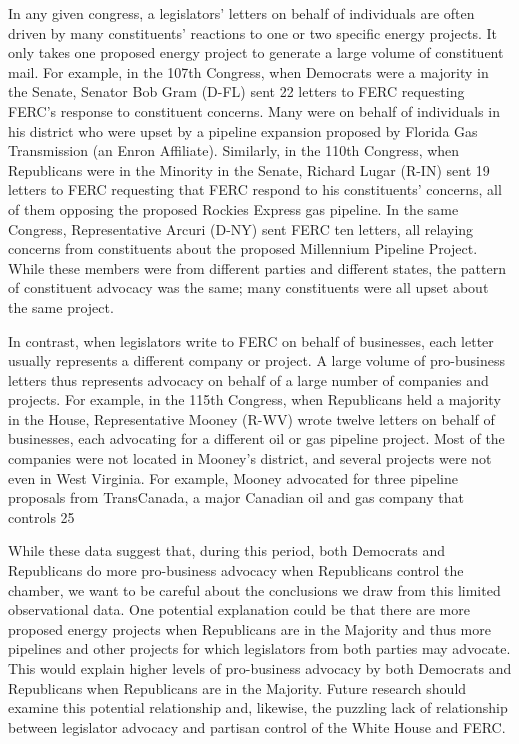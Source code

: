 \documentclass{article}
\begin{document}
In any given congress, a legislators’ letters on behalf of individuals are often driven by many constituents’ reactions to one or two specific energy projects. It only takes one proposed energy project to generate a large volume of constituent mail. 
For example, in the 107th Congress, when Democrats were a majority in the Senate, Senator Bob Gram (D-FL) sent 22 letters to FERC requesting FERC's response to constituent concerns. Many were on behalf of individuals in his district who were upset by a pipeline expansion proposed by Florida Gas Transmission (an Enron Affiliate). 
Similarly, in the 110th Congress, when Republicans were in the Minority in the Senate, Richard Lugar (R-IN) sent 19 letters to FERC requesting that FERC respond to his constituents’ concerns, all of them opposing the proposed Rockies Express gas pipeline. 
In the same Congress, Representative Arcuri (D-NY) sent FERC ten letters, all relaying concerns from constituents about the proposed Millennium Pipeline Project. While these members were from different parties and different states, the pattern of constituent advocacy was the same; many constituents were all upset about the same project.

In contrast, when legislators write to FERC on behalf of businesses, each letter usually represents a different company or project. A large volume of pro-business letters thus represents advocacy on behalf of a large number of companies and projects. For example, in the 115th Congress, when Republicans held a majority in the House, Representative Mooney (R-WV) wrote twelve letters on behalf of businesses, each advocating for a different oil or gas pipeline project. Most of the companies were not located in Mooney’s district, and several projects were not even in West Virginia. 
For example, Mooney advocated for three pipeline proposals from TransCanada, a major Canadian oil and gas company that controls 25%

While these data suggest that, during this period, both Democrats and Republicans do more pro-business advocacy when Republicans control the chamber, we want to be careful about the conclusions we draw from this limited observational data. One potential explanation could be that there are more proposed energy projects when Republicans are in the Majority and thus more pipelines and other projects for which legislators from both parties may advocate. This would explain higher levels of pro-business advocacy by both Democrats and Republicans when Republicans are in the Majority. Future research should examine this potential relationship and, likewise, the puzzling lack of relationship between legislator advocacy and partisan control of the White House and FERC.
\end{document}
